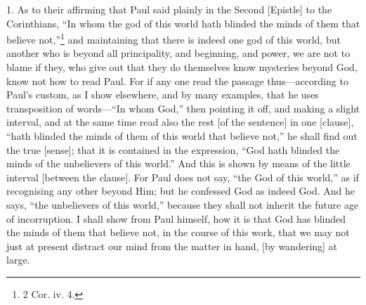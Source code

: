 
1. As to their affirming that Paul said plainly in the Second [Epistle] to the Corinthians, “In whom the god of this world hath blinded the minds of them that believe not,”\footnote{2 Cor. iv. 4.} and maintaining that there is indeed one god of this world, but another who is beyond all principality, and beginning, and power, we are not to blame if they, who give out that they do themselves know mysteries beyond God, know not how to read Paul. For if any one read the passage thus—according to Paul’s custom, as I show elsewhere, and by many examples, that he uses transposition of words—“In whom God,” then pointing it off, and making a slight interval, and at the same time read also the rest [of the sentence] in one [clause], “hath blinded the minds of them of this world that believe not,” he shall find out the true [sense]; that it is contained in the expression, “God hath blinded the minds of the unbelievers of this world.” And this is shown by means of the little interval [between the clause]. For Paul does not say, “the God of this world,” as if recognising any other beyond Him; but he confessed God as indeed God. And he says, “the unbelievers of this world,” because they shall not inherit the future age of incorruption. I shall show from Paul himself, how it is that God has blinded the minds of them that believe not, in the course of this work, that we may not just at present distract our mind from the matter in hand, [by wandering] at large.

